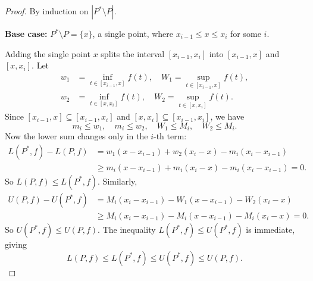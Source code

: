 \documentclass[../master/master.tex]{subfiles}
\begin{document}
\begin{proof}
By induction on $|P^* \setminus P|$.

\textbf{Base case:} $P^* \setminus P = \{x\}$, a single point, where $x_{i-1} \leq x \leq x_i$ for some $i$.

\begin{center}
\end{center}

Adding the single point $x$ splits the interval $[x_{i-1}, x_i]$ into $[x_{i-1}, x]$ and $[x, x_i]$. Let
\begin{align*}
w_1 &= \inf_{t \in [x_{i-1}, x]} f(t), \quad W_1 = \sup_{t \in [x_{i-1}, x]} f(t), \\
w_2 &= \inf_{t \in [x, x_i]} f(t), \quad W_2 = \sup_{t \in [x, x_i]} f(t).
\end{align*}
Since $[x_{i-1}, x] \subseteq [x_{i-1}, x_i]$ and $[x, x_i] \subseteq [x_{i-1}, x_i]$, we have
\[
m_i \leq w_1, \quad m_i \leq w_2, \quad W_1 \leq M_i, \quad W_2 \leq M_i.
\]
Now the lower sum changes only in the $i$-th term:
\begin{align*}
L(P^*, f) - L(P, f) &= w_1(x - x_{i-1}) + w_2(x_i - x) - m_i(x_i - x_{i-1}) \\
&\geq m_i(x - x_{i-1}) + m_i(x_i - x) - m_i(x_i - x_{i-1}) = 0.
\end{align*}
So $L(P, f) \leq L(P^*, f)$. Similarly,
\begin{align*}
U(P, f) - U(P^*, f) &= M_i(x_i - x_{i-1}) - W_1(x - x_{i-1}) - W_2(x_i - x) \\
&\geq M_i(x_i - x_{i-1}) - M_i(x - x_{i-1}) - M_i(x_i - x) = 0.
\end{align*}
So $U(P^*, f) \leq U(P, f)$. The inequality $L(P^*, f) \leq U(P^*, f)$ is immediate, giving
\[
L(P, f) \leq L(P^*, f) \leq U(P^*, f) \leq U(P, f).
\]


\end{proof}
\end{document}

